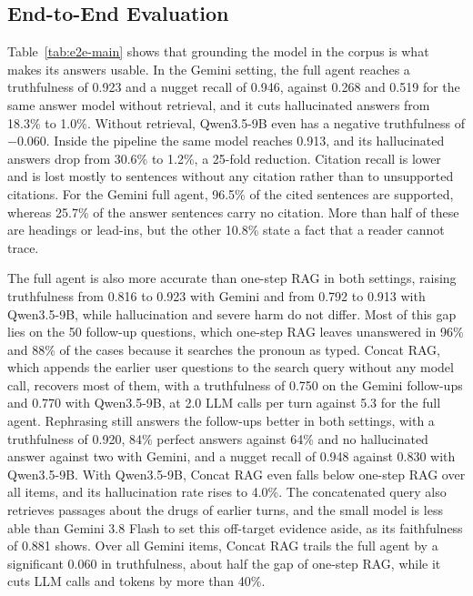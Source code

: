 \subsection{End-to-End Evaluation}\label{sec:results-e2e}



Table~\ref{tab:e2e-main} shows that grounding the model in the corpus is what makes its answers usable. In the Gemini setting, the full agent reaches a truthfulness of 0.923 and a nugget recall of 0.946, against 0.268 and 0.519 for the same answer model without retrieval, and it cuts hallucinated answers from 18.3\% to 1.0\%. Without retrieval, Qwen3.5-9B even has a negative truthfulness of $-0.060$. Inside the pipeline the same model reaches 0.913, and its hallucinated answers drop from 30.6\% to 1.2\%, a 25-fold reduction. Citation recall is lower and is lost mostly to sentences without any citation rather than to unsupported citations. For the Gemini full agent, 96.5\% of the cited sentences are supported, whereas 25.7\% of the answer sentences carry no citation. More than half of these are headings or lead-ins, but the other 10.8\% state a fact that a reader cannot trace.

The full agent is also more accurate than one-step RAG in both settings, raising truthfulness from 0.816 to 0.923 with Gemini and from 0.792 to 0.913 with Qwen3.5-9B, while hallucination and severe harm do not differ. Most of this gap lies on the 50 follow-up questions, which one-step RAG leaves unanswered in 96\% and 88\% of the cases because it searches the pronoun as typed. Concat RAG, which appends the earlier user questions to the search query without any model call, recovers most of them, with a truthfulness of 0.750 on the Gemini follow-ups and 0.770 with Qwen3.5-9B, at 2.0 LLM calls per turn against 5.3 for the full agent. Rephrasing still answers the follow-ups better in both settings, with a truthfulness of 0.920, 84\% perfect answers against 64\% and no hallucinated answer against two with Gemini, and a nugget recall of 0.948 against 0.830 with Qwen3.5-9B. With Qwen3.5-9B, Concat RAG even falls below one-step RAG over all items, and its hallucination rate rises to 4.0\%. The concatenated query also retrieves passages about the drugs of earlier turns, and the small model is less able than Gemini 3.8 Flash to set this off-target evidence aside, as its faithfulness of 0.881 shows. Over all Gemini items, Concat RAG trails the full agent by a significant 0.060 in truthfulness, about half the gap of one-step RAG, while it cuts LLM calls and tokens by more than 40\%.


